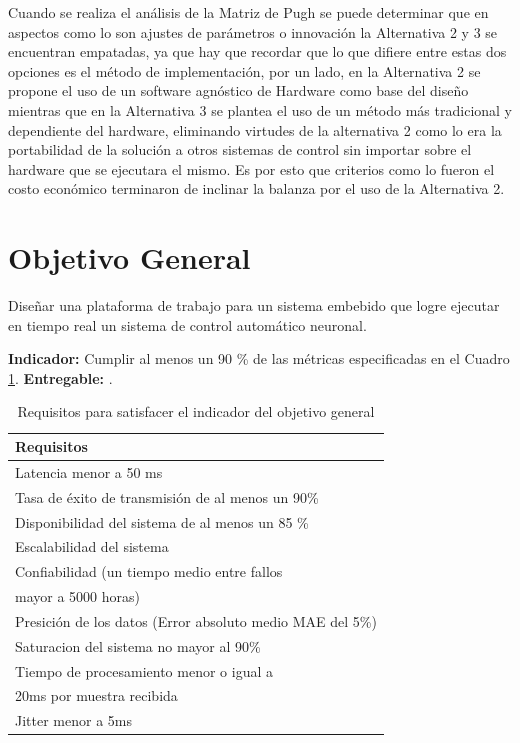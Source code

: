 \documentclass[12pt]{article}
\begin{document}
Cuando se realiza el análisis de la Matriz de Pugh se puede determinar que en aspectos como lo son ajustes de parámetros o innovación la Alternativa 2 y 3 se encuentran empatadas, ya que hay que recordar que lo que difiere entre estas dos opciones es el método de implementación, por un lado, en la Alternativa 2 se propone el uso de un software agnóstico de Hardware como base del diseño mientras que en la Alternativa 3 se plantea el uso de un método más tradicional y dependiente del hardware, eliminando virtudes de la alternativa 2 como lo era la portabilidad de la solución a otros sistemas de control sin importar sobre el hardware que se ejecutara el mismo. Es por esto que criterios como lo fueron el costo económico terminaron de inclinar la balanza por el uso de la Alternativa 2.

\section{Objetivo General}

Diseñar una plataforma de trabajo para un sistema embebido que logre ejecutar en tiempo real un sistema de control automático neuronal.

\textbf{Indicador:} Cumplir al menos un 90 \% de las métricas especificadas en el Cuadro \ref{tab:obj_1}.\newline
\textbf{Entregable:} .


\begin{table}[!h]
  \centering
  \caption{Requisitos para satisfacer el indicador del objetivo general}
  \label{tab:obj_1}
  \begin{tabular}{|l|}
    \hline
    \rowcolor[HTML]{DAE8FC} 
    Requisitos \\ \hline
    Latencia menor a 50 ms\\ \hline
    Tasa de éxito de transmisión de al menos un 90\%\\ \hline
    Disponibilidad del sistema de al menos un 85 \% \\ \hline
    Escalabilidad del sistema \\ \hline
    Confiabilidad (un tiempo medio entre fallos \\ mayor a 5000 horas) \\ \hline
    Presición de los datos (Error absoluto medio MAE del 5\%)\\ \hline
    Saturacion del sistema no mayor al 90\% \\ \hline
    Tiempo de procesamiento menor o igual a \\ 20ms por muestra recibida\\ \hline
    Jitter menor a 5ms \\ \hline
    \end{tabular}
\end{table}
\end{document}
